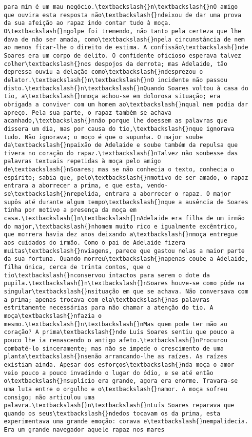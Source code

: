 \begin{Verbatim}[commandchars=\\\{\}]
para mim é um mau negócio.\textbackslash{}n\textbackslash{}nO amigo que ouvira esta resposta não\textbackslash{}ndeixou de dar uma prova da sua afeição ao rapaz indo contar tudo à moça. O\textbackslash{}ngolpe foi tremendo, não tanto pela certeza que lhe dava de não ser amada, como\textbackslash{}npela circunstância de nem ao menos ficar-lhe o direito de estima. A confissão\textbackslash{}nde Soares era um corpo de delito. O confidente oficioso esperava talvez colher\textbackslash{}nos despojos da derrota; mas Adelaide, tão depressa ouviu a delação como\textbackslash{}ndesprezou o delator.\textbackslash{}n\textbackslash{}nO incidente não passou disto.\textbackslash{}n\textbackslash{}nQuando Soares voltou à casa do tio, a\textbackslash{}nmoça achou-se em dolorosa situação; era obrigada a conviver com um homem ao\textbackslash{}nqual nem podia dar apreço. Pela sua parte, o rapaz também se achava acanhado,\textbackslash{}nnão porque lhe doessem as palavras que dissera um dia, mas por causa do tio,\textbackslash{}nque ignorava tudo. Não ignorava; o moço é que o supunha. O major soube da\textbackslash{}npaixão de Adelaide e soube também da repulsa que tivera no coração do rapaz.\textbackslash{}nTalvez não soubesse das palavras textuais repetidas à moça pelo amigo de\textbackslash{}nSoares; mas se não conhecia o texto, conhecia o espírito; sabia que, pelo\textbackslash{}nmotivo de ser amado, o rapaz entrara a aborrecer a prima, e que esta, vendo-se\textbackslash{}nrepelida, entrara a aborrecer o rapaz. O major supôs até durante algum tempo\textbackslash{}nque a ausência de Soares tinha por motivo a presença da moça em casa.\textbackslash{}n\textbackslash{}nAdelaide era filha de um irmão do major,\textbackslash{}nhomem muito rico e igualmente excêntrico, que morrera havia dez anos deixando a\textbackslash{}nmoça entregue aos cuidados do irmão. Como o pai de Adelaide fizera muitas\textbackslash{}nviagens, parece que gastou nelas a maior parte da sua fortuna. Quando morreu\textbackslash{}napenas coube a Adelaide, filha única, cerca de trinta contos, que o tio\textbackslash{}nconservou intactos para serem o dote da pupila.\textbackslash{}n\textbackslash{}nSoares houve-se como pôde na singular\textbackslash{}nsituação em que se achava. Não conversava com a prima; apenas trocava com ela\textbackslash{}nas palavras estritamente necessárias para não chamar a atenção do tio. A moça\textbackslash{}nfazia o mesmo.\textbackslash{}n\textbackslash{}nMas quem pode ter mão ao coração? A prima\textbackslash{}nde Luís Soares sentiu que pouco a pouco lhe ia renascendo o antigo afeto.\textbackslash{}nProcurou combatê-lo sinceramente; mas não se impede o crescimento de uma planta\textbackslash{}nsenão arrancando-lhe as raízes. As raízes existiam ainda. Apesar dos esforços\textbackslash{}nda moça o amor veio pouco a pouco invadindo o lugar do ódio, e se até então o\textbackslash{}nsuplício era grande, agora era enorme. Travara-se uma luta entre o orgulho e o\textbackslash{}namor. A moça sofreu consigo; não articulou uma palavra.\textbackslash{}n\textbackslash{}nLuís Soares reparava que quando os seus\textbackslash{}ndedos tocavam os da prima, esta experimentava uma grande emoção: corava e\textbackslash{}nempalidecia. Era um grande navegador aquele rapaz nos mares 
\end{Verbatim}
